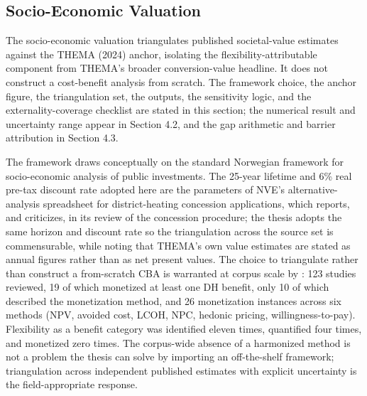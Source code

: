 \subsection{Socio-Economic Valuation}
\label{3-subsec:3.4 socio-economic valuation}

The socio-economic valuation triangulates published societal-value estimates against the THEMA (2024) anchor, isolating the flexibility-attributable component from THEMA's broader conversion-value headline. It does not construct a cost-benefit analysis from scratch. The framework choice, the anchor figure, the triangulation set, the outputs, the sensitivity logic, and the externality-coverage checklist are stated in this section; the numerical result and uncertainty range appear in Section 4.2, and the gap arithmetic and barrier attribution in Section 4.3.

The framework draws conceptually on the standard Norwegian framework for socio-economic analysis of public investments. The 25-year lifetime and 6\% real pre-tax discount rate adopted here are the parameters of NVE's alternative-analysis spreadsheet for district-heating concession applications, which \cite{Thema_fjernvarme_2024} reports, and criticizes, in its review of the concession procedure; the thesis adopts the same horizon and discount rate so the triangulation across the source set is commensurable, while noting that THEMA's own value estimates are stated as annual figures rather than as net present values. The choice to triangulate rather than construct a from-scratch CBA is warranted at corpus scale by \cite{ahmed_district_2025}: 123 studies reviewed, 19 of which monetized at least one DH benefit, only 10 of which described the monetization method, and 26 monetization instances across six methods (NPV, avoided cost, LCOH, NPC, hedonic pricing, willingness-to-pay). Flexibility as a benefit category was identified eleven times, quantified four times, and monetized zero times. The corpus-wide absence of a harmonized method is not a problem the thesis can solve by importing an off-the-shelf framework; triangulation across independent published estimates with explicit uncertainty is the field-appropriate response.

